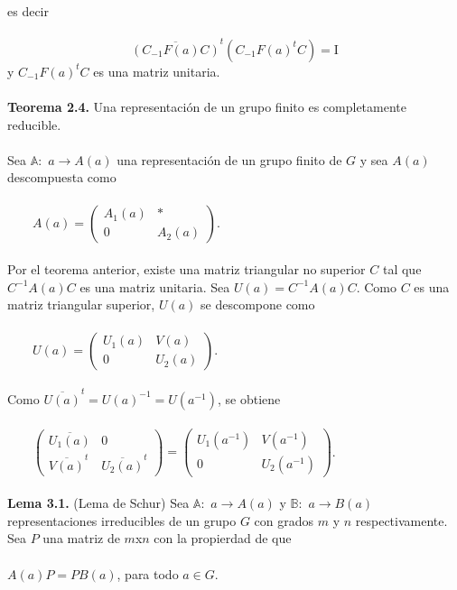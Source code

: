 \documentclass[12pt]{book}
\theoremstyle{definition}
\newcounter{in}
\newcounter{ini}
\begin{document}
es decir\\~\\
\begin{equation*}
\overline{(C_{-1}F(a)C)}^{t}(C_{-1}F(a)^{t}C)=\mathrm{I}
\end{equation*}
y $C_{-1}F(a)^{t}C$ es una matriz unitaria.\\~\\
\textbf{Teorema 2.4.} Una representación de un grupo finito es completamente reducible.\\~\\
Sea $\mathbb{A}:$ $a\rightarrow A\left(a\right)$ una representación de un grupo finito de $G$ y sea $A(a)$ descompuesta como\\~\\
$\qquad
A(a)=
\begin{pmatrix}
A_{1}(a) & * \\ 
0 & A_{2}(a)
\end{pmatrix}$.\\~\\
Por el teorema anterior, existe una matriz triangular no superior $C$ tal que $C^{-1}A(a)C$ es una matriz unitaria. Sea $U(a)=C^{-1}A(a)C$. Como $C$ es una matriz triangular superior, $U(a)$ se descompone como\\~\\
$\qquad
U(a)=
\begin{pmatrix}
U_{1}(a) & V(a) \\ 
0 & U_{2}(a)
\end{pmatrix}$.\\~\\
Como $\overline{U(a)}^{t}=U(a)^{-1}=U(a^{-1})$, se obtiene\\~\\
$\qquad
\begin{pmatrix}
\overline{U_{1}(a)} & 0 \\ 
\overline{V(a)}^{t} & \overline{U_{2}(a)}^{t}
\end{pmatrix}
=
\begin{pmatrix}
U_{1}(a^{-1}) & V(a^{-1}) \\ 
0 & U_{2}(a^{-1})
\end{pmatrix}$.\\~\\
\textbf{Lema 3.1.} (Lema de Schur) Sea $\mathbb{A}:$ $a\rightarrow A\left(a\right)$ y $\mathbb{B}:$ $a\rightarrow B\left(a\right)$ representaciones irreducibles de un grupo $G$ con grados $m$ y $n$ respectivamente. Sea $P$ una matriz de $m$x$n$ con la propierdad de que\\~\\
$A(a)P=PB(a)$, para todo $a \in G$.
\backmatter




\printindex
\end{document}

